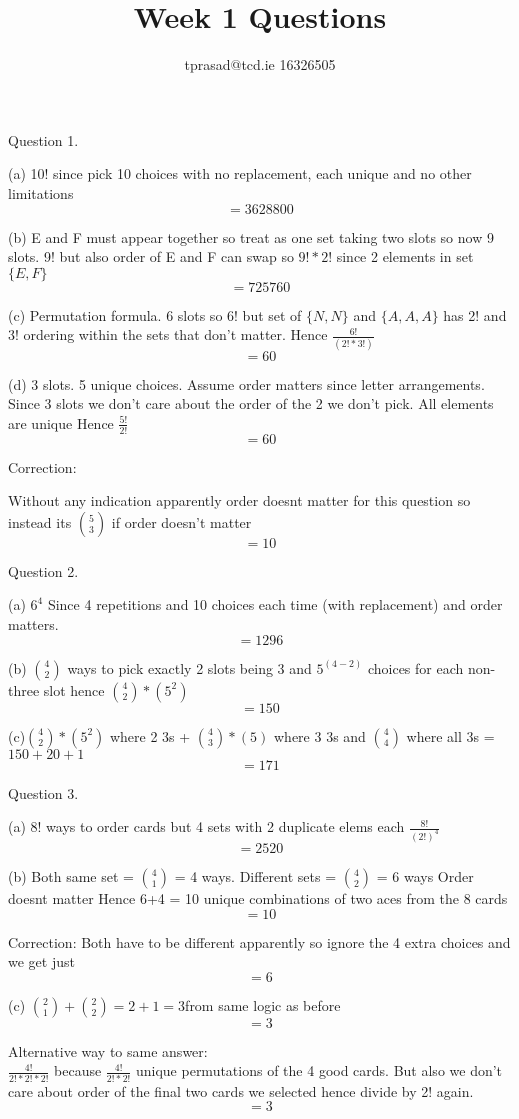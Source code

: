 \documentclass[12pt]{article}
\title{Week 1 Questions}
\author{tprasad@tcd.ie 16326505}
\begin{document}
\maketitle
\begin{flushleft}
Question 1.

(a) 10! since pick 10 choices with no replacement, each unique and no other limitations 
	\[ = 3628800 \]
	
(b) E and F must appear together so treat as one set taking two slots so now 9 slots. 
	9! but also order of E and F can swap so $9!*2!$ since 2 elements in set $\{E, F\}$ 
	\[ = 725760 \]

(c) Permutation formula. 6 slots so 6! but set of $\{N,N\}$ and $\{A,A,A\}$ has 2! and 3! ordering within the sets that don't matter. Hence $ \displaystyle \frac{6!}{(2!*3!)}$ 
 	\[ = 60 \]

(d) 3 slots. 5 unique choices. Assume order matters since letter arrangements. 
	Since 3 slots we don't care about the order of the 2 we don't pick. All elements are unique
	Hence $\displaystyle \frac{5!}{2!}$ 
	\[ = 60 \]
	
	Correction:
	
	Without any indication apparently order doesnt matter for this question so instead its
	$\displaystyle \binom{5}{3}$ if order doesn't matter 
	\[ = 10 \]
	
Question 2.

(a) $6^4$ Since 4 repetitions and 10 choices each time (with replacement) and order matters. 
	\[ = 1296 \]
	
(b) $\displaystyle \binom{4}{2}$ ways to pick exactly 2 slots being 3 and $5^{(4-2)}$ choices for each non-three slot
	hence $\displaystyle \binom{4}{2}*(5^2)$ \\
	\[ = 150 \]
	
(c)$ \displaystyle \binom{4}{2}*(5^2)$ where 2 3s + $\displaystyle \binom{4}{3}*(5)$ where 3 3s and $\displaystyle \binom{4}{4}$ where all 3s = $150 + 20 + 1$
	\[ = 171\]
	
Question 3.

(a) 8! ways to order cards but 4 sets with 2 duplicate elems each 
	$ \displaystyle \frac{8!}{(2!)^4} $ 
	\[ = 2520 \] 
	
(b) Both same set = $\displaystyle \binom{4}{1}$ = 4 ways.
	Different sets = $\displaystyle \binom{4}{2}$ = 6 ways
	Order doesnt matter
	Hence 6+4 = 10 unique combinations of two aces from the 8 cards
	\[ = 10 \]
	
	Correction:
	Both have to be different apparently so ignore the 4 extra choices and we get just 
	\[ = 6 \]
	
(c) $ \displaystyle \binom{2}{1} + \binom{2}{2} = 2 + 1 =3 $from same logic as before
	\[= 3 \]
	
	Alternative way to same answer: \\
	$\displaystyle \frac{4!}{2!*2!*2!}$ because $\displaystyle \frac{4!}{2!*2!}$ unique permutations of the 4 good cards. 
	But also we don't care about order of the final two cards we selected hence divide by 2! again.
	\[ = 3 \]
     
	

	
\end{flushleft}
\end{document}

